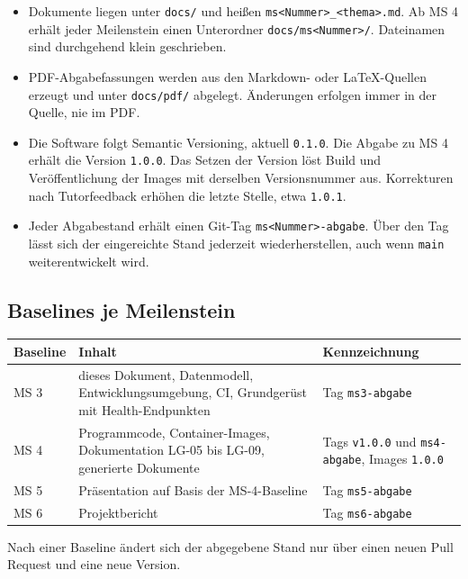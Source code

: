 \documentclass[11pt,a4paper]{article}
\begin{document}
\begin{itemize}
\item Dokumente liegen unter \texttt{docs/\allowbreak{}} und heißen \texttt{ms<Nummer>\_\allowbreak{}<thema>.md}. Ab MS 4 erhält jeder Meilenstein einen Unterordner \texttt{docs/\allowbreak{}ms<Nummer>/\allowbreak{}}. Dateinamen sind durchgehend klein geschrieben.
\item PDF-Abgabefassungen werden aus den Markdown- oder LaTeX-Quellen erzeugt und unter \texttt{docs/\allowbreak{}pdf/\allowbreak{}} abgelegt. Änderungen erfolgen immer in der Quelle, nie im PDF.
\item Die Software folgt Semantic Versioning, aktuell \texttt{0.1.0}. Die Abgabe zu MS 4 erhält die Version \texttt{1.0.0}. Das Setzen der Version löst Build und Veröffentlichung der Images mit derselben Versionsnummer aus. Korrekturen nach Tutorfeedback erhöhen die letzte Stelle, etwa \texttt{1.0.1}.
\item Jeder Abgabestand erhält einen Git-Tag \texttt{ms<Nummer>-abgabe}. Über den Tag lässt sich der eingereichte Stand jederzeit wiederherstellen, auch wenn \texttt{main} weiterentwickelt wird.
\end{itemize}


\subsection{Baselines je Meilenstein}

\begin{tabularx}{\linewidth}{@{}l >{\hsize=1.22\hsize\RaggedRight\arraybackslash}X >{\hsize=0.78\hsize\RaggedRight\arraybackslash}X@{}}
\toprule
\textbf{Baseline} & \textbf{Inhalt} & \textbf{Kennzeichnung} \\
\midrule
\endhead
MS 3 & dieses Dokument, Datenmodell, Entwicklungsumgebung, CI, Grundgerüst mit Health-Endpunkten & Tag \texttt{ms3-abgabe} \\
MS 4 & Programmcode, Container-Images, Dokumentation LG-05 bis LG-09, generierte Dokumente & Tags \texttt{v1.0.0} und \texttt{ms4-abgabe}, Images \texttt{1.0.0} \\
MS 5 & Präsentation auf Basis der MS-4-Baseline & Tag \texttt{ms5-abgabe} \\
MS 6 & Projektbericht & Tag \texttt{ms6-abgabe} \\
\bottomrule
\end{tabularx}

Nach einer Baseline ändert sich der abgegebene Stand nur über einen neuen Pull Request und eine neue Version.
\end{document}
